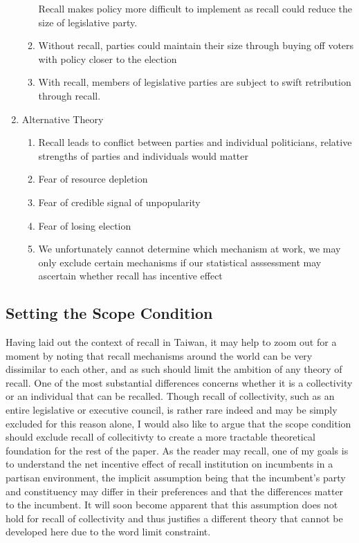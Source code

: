 \documentclass[hyphens, crop=false]{standalone}
\begin{document}
\begin{enumerate}
\begin{enumerate}
			Recall makes policy more difficult to implement
			as recall could reduce the size of legislative party.
			\item 
			Without recall, parties could maintain their size through buying off voters with policy closer to the election
			\item 
			With recall, members of legislative parties are subject to swift retribution through recall.
		\end{enumerate}
		\item 
		Alternative Theory
		\begin{enumerate}
			\item 
			Recall leads to conflict between parties and individual politicians, relative strengths of parties and individuals would matter
			\item 
			Fear of resource depletion
			\item 
			Fear of credible signal of unpopularity
			\item 
			Fear of losing election
			\item 
			We unfortunately cannot determine which mechanism at work, we may only exclude certain mechanisms if our statistical asssessment may ascertain whether recall has incentive effect
		\end{enumerate}
	\end{enumerate}
	\newpage
	
	\subsection*{Setting the Scope Condition}
		Having laid out the context of recall in Taiwan,
		it may help to zoom out for a moment by noting that
		recall mechanisms around the world can be very dissimilar to each other,
		and as such should limit the ambition of any theory of recall.
		One of the most substantial differences concerns
		whether it is a collectivity or an individual that can be recalled.
		Though recall of collectivity, such as an entire legislative or executive council,
		is rather rare indeed
		\autocite{welpRecallReferendumWorld2020}
		and may be simply excluded for this reason alone,
		I would also like to argue that the scope condition should exclude
		recall of collecitivty to create a more tractable theoretical foundation
		for the rest of the paper.
		As the reader may recall,
		one of my goals
		is to understand the net incentive effect of recall institution
		on incumbents in a partisan environment,
		the implicit assumption being that
		the incumbent's party and constituency
		may differ in their preferences and that
		the differences matter to the incumbent.
		It will soon become apparent that this assumption does not hold
		for recall of collectivity and thus justifies a different theory
		that cannot be developed here due to the word limit constraint.
		
\end{document}

